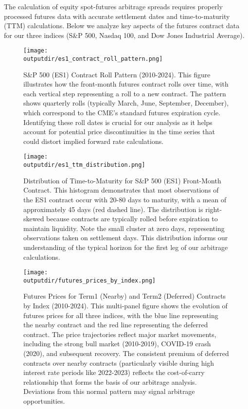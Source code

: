 \documentclass{article}
\newcommand{\outputdir}{../_output}
\begin{document}
The calculation of equity spot-futures arbitrage spreads requires properly processed futures data with accurate settlement dates and time-to-maturity (TTM) calculations. Below we analyze key aspects of the futures contract data for our three indices (S\&P 500, Nasdaq 100, and Dow Jones Industrial Average).

\begin{figure}[H]
  \centering
  \texttt{[image: \\outputdir/es1\_contract\_roll\_pattern.png]}
  \caption{S\&P 500 (ES1) Contract Roll Pattern (2010-2024). This figure illustrates how the front-month futures contract rolls over time, with each vertical step representing a roll to a new contract. The pattern shows quarterly rolls (typically March, June, September, December), which correspond to the CME's standard futures expiration cycle. Identifying these roll dates is crucial for our analysis as it helps account for potential price discontinuities in the time series that could distort implied forward rate calculations.}
  \label{fig:es1_roll_pattern}
\end{figure}

\begin{figure}[H]
  \centering
  \texttt{[image: \\outputdir/es1\_ttm\_distribution.png]}
  \caption{Distribution of Time-to-Maturity for S\&P 500 (ES1) Front-Month Contract. This histogram demonstrates that most observations of the ES1 contract occur with 20-80 days to maturity, with a mean of approximately 45 days (red dashed line). The distribution is right-skewed because contracts are typically rolled before expiration to maintain liquidity. Note the small cluster at zero days, representing observations taken on settlement days. This distribution informs our understanding of the typical horizon for the first leg of our arbitrage calculations.}
  \label{fig:es1_ttm_distribution}
\end{figure}

\begin{figure}[H]
  \centering
  \texttt{[image: \\outputdir/futures\_prices\_by\_index.png]}
  \caption{Futures Prices for Term1 (Nearby) and Term2 (Deferred) Contracts by Index (2010-2024). This multi-panel figure shows the evolution of futures prices for all three indices, with the blue line representing the nearby contract and the red line representing the deferred contract. The price trajectories reflect major market movements, including the strong bull market (2010-2019), COVID-19 crash (2020), and subsequent recovery. The consistent premium of deferred contracts over nearby contracts (particularly visible during high interest rate periods like 2022-2023) reflects the cost-of-carry relationship that forms the basis of our arbitrage analysis. Deviations from this normal pattern may signal arbitrage opportunities.}
  \label{fig:futures_prices}
\end{figure}
\end{document}
